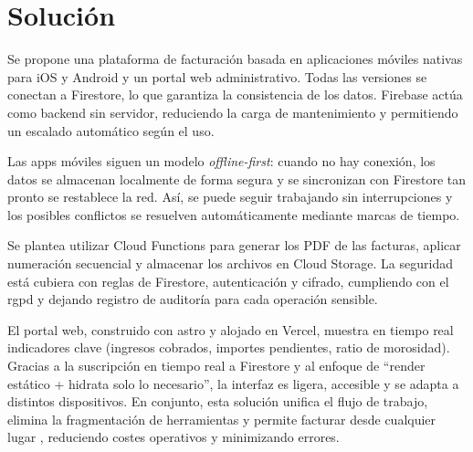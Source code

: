 \section{Solución}
\begin{large}
Se propone una plataforma de facturación basada en aplicaciones móviles nativas para iOS y Android y un portal web administrativo. Todas las versiones se conectan a Firestore, lo que garantiza la consistencia de los datos. Firebase actúa como backend sin servidor, reduciendo la carga de mantenimiento y permitiendo un escalado automático según el uso.

Las apps móviles siguen un modelo \textit{offline-first}: cuando no hay conexión, los datos se almacenan localmente de forma segura y se sincronizan con Firestore tan pronto se restablece la red. Así, se puede seguir trabajando sin interrupciones y los posibles conflictos se resuelven automáticamente mediante marcas de tiempo.

Se plantea utilizar Cloud Functions para generar los PDF de las facturas, aplicar numeración secuencial y almacenar los archivos en Cloud Storage. La seguridad está cubiera con reglas de Firestore, autenticación y cifrado, cumpliendo con el \gls{rgpd} y dejando registro de auditoría para cada operación sensible.

El portal web, construido con \gls{astro} y alojado en Vercel, muestra en tiempo real indicadores clave (ingresos cobrados, importes pendientes, ratio de morosidad). Gracias a la suscripción en tiempo real a Firestore y al enfoque de “render estático + hidrata solo lo necesario”, la interfaz es ligera, accesible y se adapta a distintos dispositivos. En conjunto, esta solución unifica el flujo de trabajo, elimina la fragmentación de herramientas y permite facturar desde cualquier lugar , reduciendo costes operativos y minimizando errores.
\end{large}

